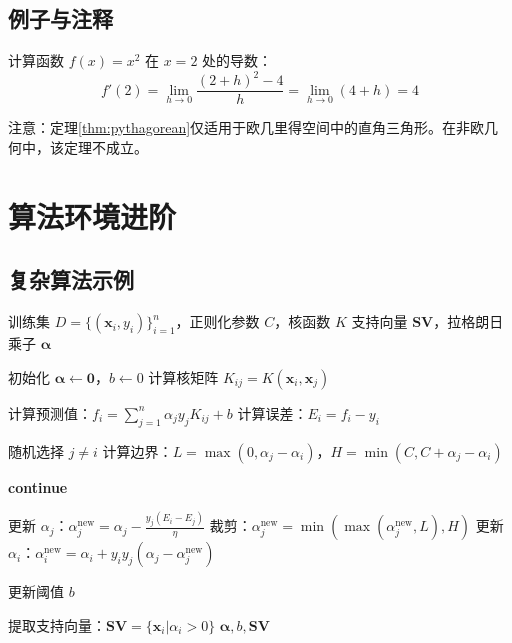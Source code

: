 \subsection{例子与注释}
\begin{example}[导数计算]
\label{ex:derivative}
计算函数 $f(x) = x^2$ 在 $x=2$ 处的导数：
\[
f'(2) = \lim_{h \to 0} \frac{(2+h)^2 - 4}{h} = \lim_{h \to 0} (4 + h) = 4
\]
\end{example}

\begin{remark}
\label{rem:note}
注意：定理\ref{thm:pythagorean}仅适用于欧几里得空间中的直角三角形。在非欧几何中，该定理不成立。
\end{remark}

\section{算法环境进阶}
\label{sec:algorithms_adv}

\subsection{复杂算法示例}
\begin{algorithm}[htbp]
  \caption{支持向量机训练算法}
  \label{alg:svm}
  \begin{algorithmic}[1]
    \REQUIRE 训练集 $D = \{(\mathbf{x}_i, y_i)\}_{i=1}^n$，正则化参数 $C$，核函数 $K$
    \ENSURE 支持向量 $\mathbf{SV}$，拉格朗日乘子 $\boldsymbol{\alpha}$
    
    \STATE 初始化 $\boldsymbol{\alpha} \leftarrow \mathbf{0}$，$b \leftarrow 0$
    \STATE 计算核矩阵 $K_{ij} = K(\mathbf{x}_i, \mathbf{x}_j)$
    
        \STATE 计算预测值：$f_i = \sum_{j=1}^n \alpha_j y_j K_{ij} + b$
        \STATE 计算误差：$E_i = f_i - y_i$
        
          \STATE 随机选择 $j \neq i$
          \STATE 计算边界：$L = \max(0, \alpha_j - \alpha_i)$，$H = \min(C, C + \alpha_j - \alpha_i)$
          
            \STATE \textbf{continue}
          \ENDIF
          
          \STATE 更新 $\alpha_j$：$\alpha_j^{\text{new}} = \alpha_j - \frac{y_j(E_i - E_j)}{\eta}$
          \STATE 裁剪：$\alpha_j^{\text{new}} = \min(\max(\alpha_j^{\text{new}}, L), H)$
          \STATE 更新 $\alpha_i$：$\alpha_i^{\text{new}} = \alpha_i + y_i y_j (\alpha_j - \alpha_j^{\text{new}})$
          
          \STATE 更新阈值 $b$
        \ENDIF
      \ENDFOR
    \ENDWHILE
    
    \STATE 提取支持向量：$\mathbf{SV} = \{\mathbf{x}_i | \alpha_i > 0\}$
    \RETURN $\boldsymbol{\alpha}, b, \mathbf{SV}$
  \end{algorithmic}
\end{algorithm}

